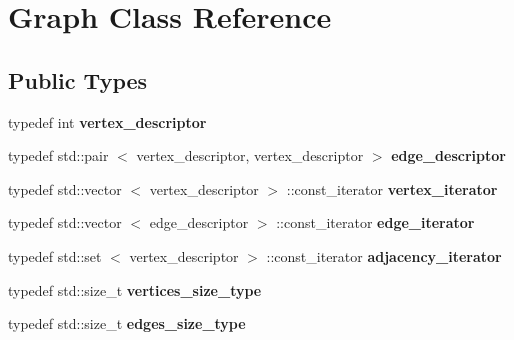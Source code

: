 \hypertarget{classGraph}{\section{\-Graph \-Class \-Reference}
\label{classGraph}
}
\subsection*{\-Public \-Types}
\begin{DoxyCompactItemize}
\item 
\hypertarget{classGraph_adeba8286db7d42e6ffac2554b314d61d}{typedef int {\bfseries vertex\-\_\-descriptor}}\label{classGraph_adeba8286db7d42e6ffac2554b314d61d}

\item 
\hypertarget{classGraph_ad2d4a30b7897a48729fa7e3bee649d04}{typedef std\-::pair\*
$<$ vertex\-\_\-descriptor, \*
vertex\-\_\-descriptor $>$ {\bfseries edge\-\_\-descriptor}}\label{classGraph_ad2d4a30b7897a48729fa7e3bee649d04}

\item 
\hypertarget{classGraph_aee10ac35c0bad19ebc93f33eb08e149d}{typedef std\-::vector\*
$<$ vertex\-\_\-descriptor $>$\*
\-::const\-\_\-iterator {\bfseries vertex\-\_\-iterator}}\label{classGraph_aee10ac35c0bad19ebc93f33eb08e149d}

\item 
\hypertarget{classGraph_ab77c243a917ca1e81ea1719c3ebb6ffa}{typedef std\-::vector\*
$<$ edge\-\_\-descriptor $>$\*
\-::const\-\_\-iterator {\bfseries edge\-\_\-iterator}}\label{classGraph_ab77c243a917ca1e81ea1719c3ebb6ffa}

\item 
\hypertarget{classGraph_ad03c07358f7be9768eba3825f75ded45}{typedef std\-::set\*
$<$ vertex\-\_\-descriptor $>$\*
\-::const\-\_\-iterator {\bfseries adjacency\-\_\-iterator}}\label{classGraph_ad03c07358f7be9768eba3825f75ded45}

\item 
\hypertarget{classGraph_ac1e19ecbf236d08dff611584e4c9403e}{typedef std\-::size\-\_\-t {\bfseries vertices\-\_\-size\-\_\-type}}\label{classGraph_ac1e19ecbf236d08dff611584e4c9403e}

\item 
\hypertarget{classGraph_a1924745b438f862ba9aa7cd0ff5b7da5}{typedef std\-::size\-\_\-t {\bfseries edges\-\_\-size\-\_\-type}}\label{classGraph_a1924745b438f862ba9aa7cd0ff5b7da5}

\end{DoxyCompactItemize}
